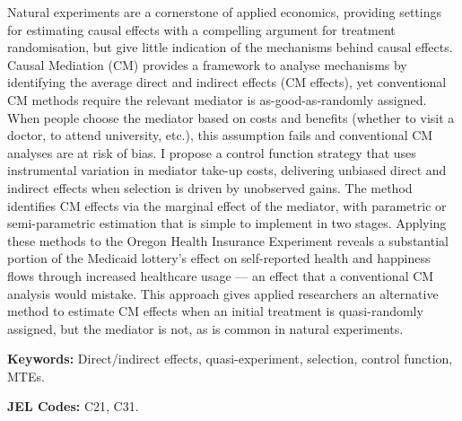 \noindent
Natural experiments are a cornerstone of applied economics, providing settings for estimating causal effects with a compelling argument for treatment randomisation, but give little indication of the mechanisms behind causal effects.
Causal Mediation (CM) provides a framework to analyse mechanisms by identifying the average direct and indirect effects (CM effects), yet conventional CM methods require the relevant mediator is as-good-as-randomly assigned.
When people choose the mediator based on costs and benefits (whether to visit a doctor, to attend university, etc.), this assumption fails and conventional CM analyses are at risk of bias.
I propose a control function strategy that uses instrumental variation in mediator take-up costs, delivering unbiased direct and indirect effects when selection is driven by unobserved gains.
The method identifies CM effects via the marginal effect of the mediator, with parametric or semi-parametric estimation that is simple to implement in two stages.
Applying these methods to the Oregon Health Insurance Experiment reveals a substantial portion of the Medicaid lottery's effect on self-reported health and happiness flows through increased healthcare usage --- an effect that a conventional CM analysis would mistake.
This approach gives applied researchers an alternative method to estimate CM effects when an initial treatment is quasi-randomly assigned, but the mediator is not, as is common in natural experiments.

\vspace{0.5cm}
\noindent
\textbf{Keywords:}
Direct/indirect effects, quasi-experiment, selection, control function, MTEs.

\vspace{0.1cm}
\noindent
\textbf{JEL Codes:}
C21, C31.
